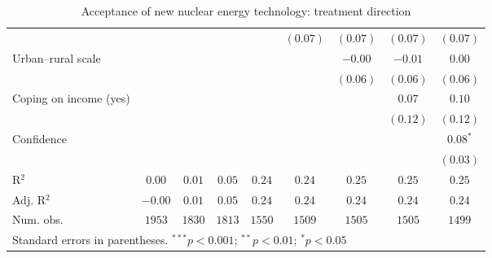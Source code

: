 \begin{table}[h]
\begin{center}
\begin{tabular}{l c c c c c c c c}
                                                                                &              &               &               &               & $(0.07)$      & $(0.07)$      & $(0.07)$      & $(0.07)$      \\
Urban–rural scale                                                               &              &               &               &               &               & $-0.00$       & $-0.01$       & $0.00$        \\
                                                                                &              &               &               &               &               & $(0.06)$      & $(0.06)$      & $(0.06)$      \\
Coping on income (yes)                                                          &              &               &               &               &               &               & $0.07$        & $0.10$        \\
                                                                                &              &               &               &               &               &               & $(0.12)$      & $(0.12)$      \\
Confidence                                                                      &              &               &               &               &               &               &               & $0.08^{*}$    \\
                                                                                &              &               &               &               &               &               &               & $(0.03)$      \\
\hline
R$^2$                                                                           & $0.00$       & $0.01$        & $0.05$        & $0.24$        & $0.24$        & $0.25$        & $0.25$        & $0.25$        \\
Adj. R$^2$                                                                      & $-0.00$      & $0.01$        & $0.05$        & $0.24$        & $0.24$        & $0.24$        & $0.24$        & $0.24$        \\
Num. obs.                                                                       & $1953$       & $1830$        & $1813$        & $1550$        & $1509$        & $1505$        & $1505$        & $1499$        \\
\hline
\multicolumn{9}{l}{\scriptsize{Standard errors in parentheses. $^{***}p<0.001$; $^{**}p<0.01$; $^{*}p<0.05$}}
\end{tabular}
\caption{Acceptance of new nuclear energy technology: treatment direction}
\label{table:acceptance_new_nucs_treatment_direction}
\end{center}
\end{table}
